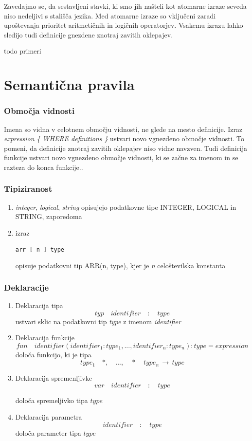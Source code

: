 \documentclass[a4paper, 12p]{book}
\begin{document}
Zavedajmo se, da sestavljeni stavki, ki smo jih našteli kot atomarne izraze seveda niso nedeljivi s stališča jezika. Med atomarne izraze so vključeni zaradi upoštevanja prioritet aritmetičnih in logičnih operatorjev. Vsakemu izrazu lahko sledijo tudi definicije gnezdene znotraj zavitih oklepajev.

todo primeri

\section{Semantična pravila}

\subsubsection{Območja vidnosti}

Imena so vidna v celotnem območju vidnosti, ne glede na mesto definicije. Izraz \textit{expression \{ WHERE definitions \}} ustvari novo vgnezdeno območje vidnosti. To pomeni, da definicije znotraj zavitih oklepajev niso vidne navzven. Tudi definicija funkcije ustvari novo vgnezdeno območje vidnosti, ki se začne za imenom in se razteza do konca funkcije..

\subsubsection{Tipiziranost}

\begin{enumerate}
	\item \textit{integer}, \textit{logical}, \textit{string} opisujejo podatkovne tipe INTEGER, LOGICAL in STRING, zaporedoma
	\item izraz 
\begin{lstlisting}[]
	arr [ n ] type
\end{lstlisting}
	opisuje podatkovni tip ARR(n, type), kjer je \textit{n} celoštevilska konstanta 
\end{enumerate}

\subsubsection{Deklaracije}

\begin{enumerate}
	\item Deklaracija tipa
\[
typ\quad  identifier\quad  :\quad  type
\]
	ustvari sklic na podatkovni tip \textit{type} z imenom \textit{identifier}
	\item Deklaracija funkcije
\[ fun\quad identifier  ( identifier_1 : type_1, ..., identifier_n : type_n ) : type = expression \]
	določa funkcijo, ki je tipa \[type_1 \quad *, \quad  ..., \quad *\quad  type_n \,\to\, type \]
	\item Deklaracija spremenljivke
\[
var \quad identifier\quad :\quad type
\]

določa spremeljivko tipa $type$
	\item Deklaracija parametra
\[
identifier \quad :\quad type
\]
določa parameter tipa $type$
\end{enumerate}
\end{document}
